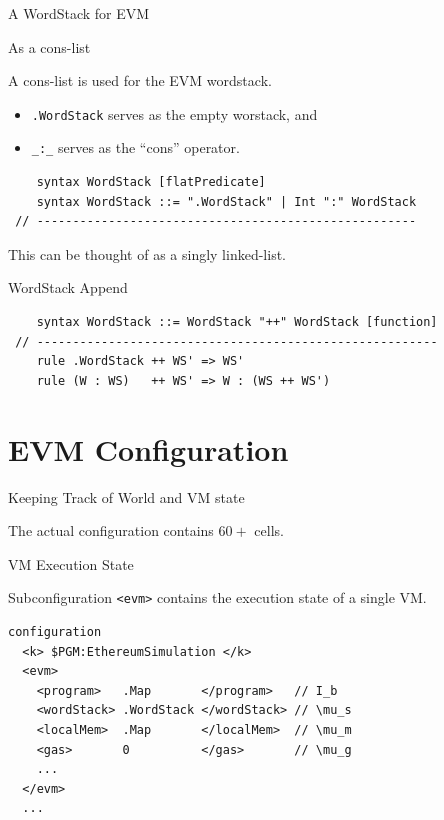 \documentclass[8pt,ignorenonframetext,]{beamer}
\providecommand{\tightlist}{%
  \setlength{\itemsep}{0pt}\setlength{\parskip}{0pt}}
\begin{document}
\begin{frame}[fragile]{A WordStack for EVM}

\pause

\begin{block}{As a cons-list}

A cons-list is used for the EVM wordstack.

\begin{itemize}
\tightlist
\item
  \texttt{.WordStack} serves as the empty worstack, and
\item
  \texttt{\_:\_} serves as the ``cons'' operator.
\end{itemize}

\begin{verbatim}
    syntax WordStack [flatPredicate]
    syntax WordStack ::= ".WordStack" | Int ":" WordStack
 // -----------------------------------------------------
\end{verbatim}

This can be thought of as a singly linked-list.

\pause

\end{block}

\begin{block}{WordStack Append}

\begin{verbatim}
    syntax WordStack ::= WordStack "++" WordStack [function]
 // --------------------------------------------------------
    rule .WordStack ++ WS' => WS'
    rule (W : WS)   ++ WS' => W : (WS ++ WS')
\end{verbatim}

\end{block}

\end{frame}

\section{EVM Configuration}\label{evm-configuration}

\begin{frame}[fragile]{Keeping Track of World and VM state}

The actual configuration contains \(60+\) cells.

\begin{block}{VM Execution State}

Subconfiguration \texttt{\textless{}evm\textgreater{}} contains the
execution state of a single VM.

\begin{verbatim}
configuration
  <k> $PGM:EthereumSimulation </k>
  <evm>
    <program>   .Map       </program>   // I_b
    <wordStack> .WordStack </wordStack> // \mu_s
    <localMem>  .Map       </localMem>  // \mu_m
    <gas>       0          </gas>       // \mu_g
    ...
  </evm>
  ...
\end{verbatim}

\end{block}

\end{frame}
\end{document}

